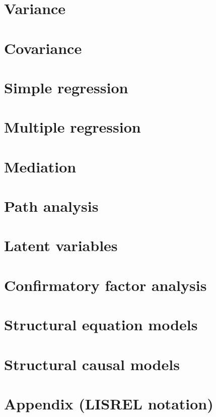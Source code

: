 \documentclass[
]{book}
\begin{document}
\hypertarget{variance}{%
\chapter{Variance}\label{variance}}

\hypertarget{covariance}{%
\chapter{Covariance}\label{covariance}}

\hypertarget{simple-regression}{%
\chapter{Simple regression}\label{simple-regression}}

\hypertarget{multiple-regression}{%
\chapter{Multiple regression}\label{multiple-regression}}

\hypertarget{mediation}{%
\chapter{Mediation}\label{mediation}}

\hypertarget{path-analysis}{%
\chapter{Path analysis}\label{path-analysis}}

\hypertarget{latent-variables}{%
\chapter{Latent variables}\label{latent-variables}}

\hypertarget{confirmatory-factor-analysis}{%
\chapter{Confirmatory factor analysis}\label{confirmatory-factor-analysis}}

\hypertarget{structural-equation-models}{%
\chapter{Structural equation models}\label{structural-equation-models}}

\hypertarget{structural-causal-models}{%
\chapter{Structural causal models}\label{structural-causal-models}}

\hypertarget{appendix-lisrel-notation}{%
\chapter*{Appendix (LISREL notation)}\label{appendix-lisrel-notation}}

  
\end{document}
